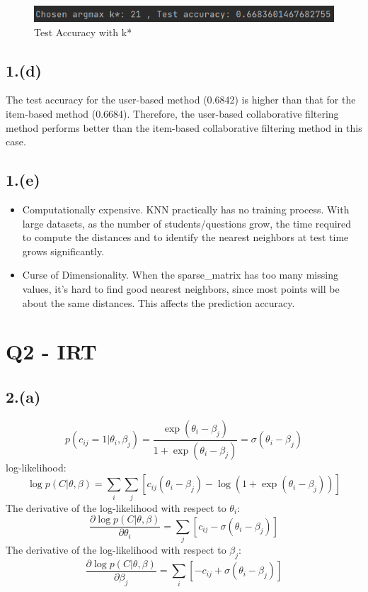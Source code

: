 \documentclass{article}
\begin{document}
\begin{figure}[H]
    \centering
    \includegraphics[width=\textwidth]{knn_impute_by_item_test.png}
    \caption{Test Accuracy with k*}
\end{figure}

\subsection*{1.(d)}
The test accuracy for the user-based method (0.6842) is higher than that for the item-based method (0.6684). Therefore, the user-based collaborative filtering method performs better than the item-based collaborative filtering method in this case.

\subsection*{1.(e)}
\begin{itemize}
    \item Computationally expensive. KNN practically has no training process. With large datasets, as the number of students/questions grow, the time required to compute the distances and to identify the nearest neighbors at test time grows significantly.
    \item Curse of Dimensionality. When the sparse\_matrix has too many missing values, it’s hard to find good nearest neighbors, since most points will be about the same distances. This affects the prediction accuracy.
\end{itemize}


\newpage
\section*{Q2 - IRT}

\subsection*{2.(a)}

\[
p(c_{ij} = 1 | \theta_i, \beta_j) = \frac{\exp(\theta_i - \beta_j)}{1 + \exp(\theta_i - \beta_j)} = \sigma(\theta_i - \beta_j)
\]
log-likelihood:
\[
\log p(C | \theta, \beta) = \sum_{i}\sum_{j} \left[ c_{ij} (\theta_i - \beta_j) - \log (1 + \exp(\theta_i - \beta_j)) \right]
\]
The derivative of the log-likelihood with respect to $\theta_i$:
\[
\frac{\partial \log p(C | \theta, \beta)}{\partial \theta_i} = \sum_{j} \left[ c_{ij} - \sigma(\theta_i - \beta_j) \right]
\]
The derivative of the log-likelihood with respect to $\beta_j$:
\[
\frac{\partial \log p(C | \theta, \beta)}{\partial \beta_j} = \sum_{i} \left[ - c_{ij} + \sigma(\theta_i - \beta_j) \right]
\]
\end{document}
